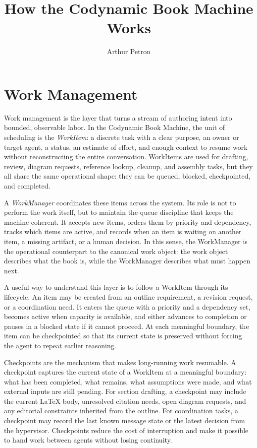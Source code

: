 \documentclass[11pt]{article}
\title{How the Codynamic Book Machine Works}
\author{Arthur Petron}
\begin{document}
\section*{Work Management}

Work management is the layer that turns a stream of authoring intent into bounded, observable labor. In the Codynamic Book Machine, the unit of scheduling is the \emph{WorkItem}: a discrete task with a clear purpose, an owner or target agent, a status, an estimate of effort, and enough context to resume work without reconstructing the entire conversation. WorkItems are used for drafting, review, diagram requests, reference lookup, cleanup, and assembly tasks, but they all share the same operational shape: they can be queued, blocked, checkpointed, and completed.

A \emph{WorkManager} coordinates these items across the system. Its role is not to perform the work itself, but to maintain the queue discipline that keeps the machine coherent. It accepts new items, orders them by priority and dependency, tracks which items are active, and records when an item is waiting on another item, a missing artifact, or a human decision. In this sense, the WorkManager is the operational counterpart to the canonical work object: the work object describes what the book is, while the WorkManager describes what must happen next.

A useful way to understand this layer is to follow a WorkItem through its lifecycle. An item may be created from an outline requirement, a revision request, or a coordination need. It enters the queue with a priority and a dependency set, becomes active when capacity is available, and either advances to completion or pauses in a blocked state if it cannot proceed. At each meaningful boundary, the item can be checkpointed so that its current state is preserved without forcing the agent to repeat earlier reasoning.

Checkpoints are the mechanism that makes long-running work resumable. A checkpoint captures the current state of a WorkItem at a meaningful boundary: what has been completed, what remains, what assumptions were made, and what external inputs are still pending. For section drafting, a checkpoint may include the current \LaTeX{} body, unresolved citation needs, open diagram requests, and any editorial constraints inherited from the outline. For coordination tasks, a checkpoint may record the last known message state or the latest decision from the hypervisor. Checkpoints reduce the cost of interruption and make it possible to hand work between agents without losing continuity.
\end{document}
